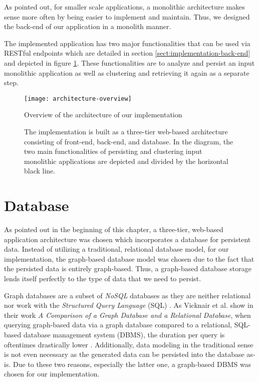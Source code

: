 \documentclass[12pt,a4paper]{report}
\begin{document}
As pointed out, for smaller scale applications, a monolithic architecture
makes sense more often by being easier to implement and maintain.
Thus, we designed the back-end of our application in a monolith manner.

The implemented application has two major functionalities that can be used
via RESTful endpoints which are detailed in section \ref{sect:implementation-back-end}
and depicted in figure \ref{fig:architecture-overview}.
These functionalities are to analyze and persist an input monolithic application
as well as clustering and retrieving it again as a separate step.

\begin{figure}[htbp]
\centering
\texttt{[image: architecture-overview]}
\caption{Overview of the architecture of our implementation}
\caption*{\centering
    The implementation is built as a three-tier web-based architecture consisting of
    front-end, back-end, and database. In the diagram, the two main functionalities of
    persisting and clustering input monolithic applications are depicted and
    divided by the horizontal black line.
}
\label{fig:architecture-overview}
\end{figure}



\section{Database} \label{sect:implementation-database}

As pointed out in the beginning of this chapter, a three-tier, web-based
application architecture was chosen which incorporates a database
for persistent data.
Instead of utilizing a traditional, relational database model,
for our implementation, the graph-based database model was chosen
due to the fact that the persisted data is entirely graph-based.
Thus, a graph-based database storage lends itself perfectly to the
type of data that we need to persist.

Graph databases are a subset of \textit{NoSQL} databases as they are
neither relational nor work with the \textit{Structured Query Language} (SQL)
\cite{vicknair2010graphdatabase}.
As Vicknair et al. show in their work \textit{A Comparison of a
Graph Database and a Relational Database}, when querying graph-based
data via a graph database compared to a relational, SQL-based
database management system (DBMS), the duration per query is oftentimes
drastically lower \cite{vicknair2010graphdatabase}.
Additionally, data modeling in the traditional sense is not even
necessary as the generated data can be persisted into the database as-is.
Due to these two reasons, especially the latter one, a graph-based DBMS
was chosen for our implementation.
\end{document}
